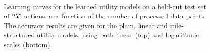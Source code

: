 \begin{figure}[p!]
\begin{center}\end{center} $\phantom{a}$\vspace{1cm}$\phantom{a}$ 
\begin{center}\end{center}
\caption{Learning curves for the learned utility models on a held-out test set of 255 actions as a function of the number of processed data points.  The accuracy results are given for the plain, linear and rule-structured utility models, using both linear (top) and logarithmic scales (bottom).}
\label{results}
\end{figure}


